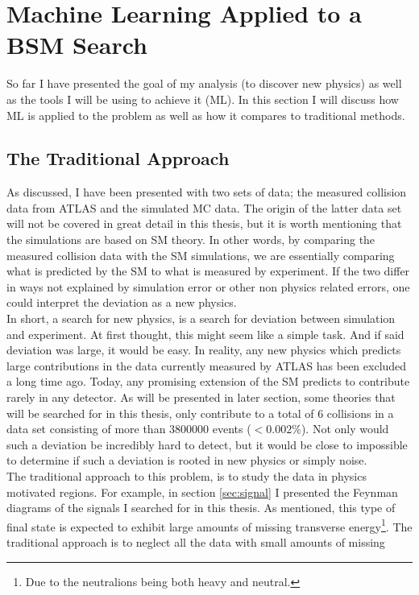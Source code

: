 \section{Machine Learning Applied to a BSM Search}\label{sec:MLHEP}
So far I have presented the goal of my analysis (to discover new physics)
as well as the tools I will be using to achieve it (\ac{ML}). In this section
I will discuss how \ac{ML} is applied to the problem as well as how it compares
to traditional methods.
\subsection{The Traditional Approach}
As discussed, I have been presented with two sets of data; the measured collision 
data from \ac{ATLAS} and the simulated \ac{MC} data. The origin of the latter data set 
will not be covered in great detail in this thesis, but it is worth mentioning that 
the simulations are based on \ac{SM} theory. In other words, by comparing the measured collision 
data with the \ac{SM} simulations, we are essentially comparing what is predicted by the \ac{SM} 
to what is measured by experiment. If the two differ in ways not explained by simulation error 
or other non physics related errors, one could interpret the deviation as a new physics.
\\
In short, a search for new physics, is a search for deviation between simulation and 
experiment. At first thought, this might seem like a simple task. And if said deviation 
was large, it would be easy. In reality, any new physics which predicts large contributions 
in the data currently measured by \ac{ATLAS} has been excluded a long time ago. Today, any
promising extension of the \ac{SM} predicts to contribute rarely in any detector. As will 
be presented in later section, some theories that will be searched for in this thesis, only 
contribute to a total of 6 collisions in a data set consisting of more than $3800000$ events 
($<0.002\%$). Not only would such a deviation be incredibly hard to detect, but it would 
be close to impossible to determine if such a deviation is rooted in new physics or simply 
noise. 
\\
The traditional approach to this problem, is to study the data in physics motivated regions. 
For example, in section \ref{sec:signal} I presented the Feynman diagrams of the signals I 
searched for in this thesis. As mentioned, this type of final state is expected to exhibit 
large amounts of missing transverse energy\footnote{Due to the neutralions being both heavy 
and neutral.}. The traditional approach is to neglect all the data with small amounts of missing 
